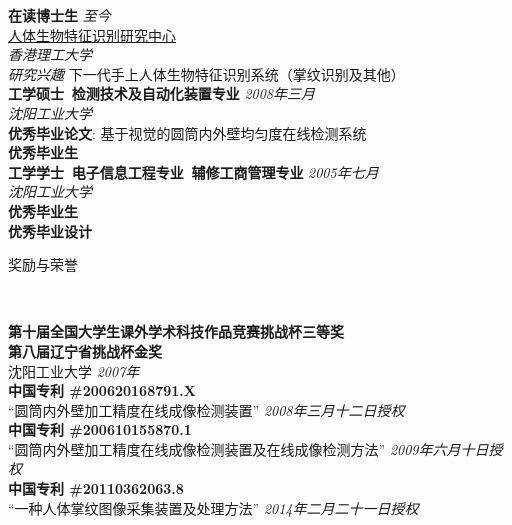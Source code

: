 \documentclass[9pt]{article}
\newenvironment{changemargin}[2]{%
  \begin{list}{}{%
    \setlength{\topsep}{0pt}%
    \setlength{\leftmargin}{#1}%
    \setlength{\rightmargin}{#2}%
    \setlength{\listparindent}{\parindent}%
    \setlength{\itemindent}{\parindent}%
    \setlength{\parsep}{\parskip}%
  }%
  \item[]}{\end{list}
}
\newcommand{\lineover}{
	\begin{changemargin}{-0.05in}{-0.05in}
		\vspace*{-8pt}
		\hrulefill \\
		\vspace*{-2pt}
	\end{changemargin}
}
\newcommand{\header}[1]{
	\begin{changemargin}{-0.5in}{-0.5in}
		\scshape{#1}\\
  	\lineover
	\end{changemargin}
}
\newenvironment{body} {
	\vspace*{-16pt}
	\begin{changemargin}{-0.25in}{-0.5in}
  }	
	{\end{changemargin}
}
\begin{document}
\begin{body}
	\vspace{14pt}
	\textbf{在读博士生}{} \hfill \emph{至今}{} \\
    \href{http://www.comp.polyu.edu.hk/~biometrics/}{人体生物特征识别研究中心}\\    
	\emph{香港理工大学}\\  
    \emph{研究兴趣} 下一代手上人体生物特征识别系统（掌纹识别及其他）\\
  \medskip
	\textbf{工学硕士\, 检测技术及自动化装置专业}{} \hfill \emph{2008年三月}{} \\
	\emph{沈阳工业大学}\\
	\textbf{优秀毕业论文}: 基于视觉的圆筒内外壁均匀度在线检测系统\\
    \textbf{优秀毕业生}\\
  \medskip
	\textbf{工学学士\, 电子信息工程专业\, 辅修工商管理专业} \hfill \emph{2005年七月} \\
    \emph{沈阳工业大学}\\
    \textbf{优秀毕业生}\\
    \textbf{优秀毕业设计}\\
\end{body}

\medskip


\header{奖励与荣誉}

\begin{body}
	\vspace{14pt}	
    \textbf{第十届全国大学生课外学术科技作品竞赛挑战杯三等奖\\
    第八届辽宁省挑战杯金奖}\\
    沈阳工业大学 \hfill{} \emph{2007年}\\
    \medskip
    \textbf{中国专利 \#200620168791.X}\\
    ``圆筒内外壁加工精度在线成像检测装置'' 
    \hfill{} \emph{2008年三月十二日授权}\\
    \medskip
    \textbf{中国专利 \#200610155870.1}\\
    ``圆筒内外壁加工精度在线成像检测装置及在线成像检测方法'' 
    \hfill{} \emph{2009年六月十日授权}\\
    \medskip    
    \textbf{中国专利 \#20110362063.8}\\
    ``一种人体掌纹图像采集装置及处理方法'' 
    \hfill{} \emph{2014年二月二十一日授权}
\end{body}
\end{document}
